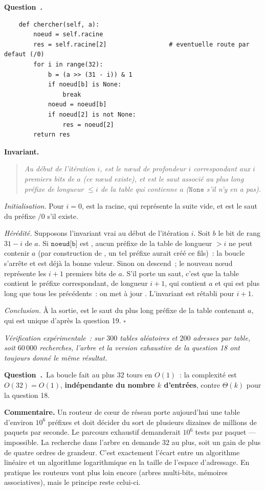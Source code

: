 \documentclass[11pt,a4paper]{article}
\renewcommand{\Q}{\medskip\par\stepcounter{qcnt}\noindent\textbf{\color{cnc}Question~\theqcnt.}~}
\begin{document}
\Q
\begin{lstlisting}
    def chercher(self, a):
        noeud = self.racine
        res = self.racine[2]                 # eventuelle route par defaut (/0)
        for i in range(32):
            b = (a >> (31 - i)) & 1
            if noeud[b] is None:
                break
            noeud = noeud[b]
            if noeud[2] is not None:
                res = noeud[2]
        return res
\end{lstlisting}
\textbf{Invariant.}
\begin{quote}\itshape
Au début de l'itération $i$,  est le n\oe ud de profondeur $i$ correspondant aux
$i$ premiers bits de $a$ (ce n\oe ud existe), et  est le saut associé au plus long
préfixe de longueur $\le i$ de la table qui contienne $a$ ($\texttt{None}$ s'il n'y en a pas).
\end{quote}
\emph{Initialisation.} Pour $i=0$,  est la racine, qui représente la suite vide,
et  est le saut du préfixe $/0$ s'il existe.

\emph{Hérédité.} Supposons l'invariant vrai au début de l'itération $i$. Soit $b$ le bit de
rang $31-i$ de $a$. Si $\texttt{noeud[b]}$ est , aucun préfixe de la table de
longueur $>i$ ne peut contenir $a$ (par construction de , un tel préfixe aurait
créé ce fils)~: la boucle s'arrête et  est déjà la bonne valeur. Sinon on descend~;
le nouveau n\oe ud représente les $i+1$ premiers bits de $a$. S'il porte un saut, c'est que
la table contient le préfixe correspondant, de longueur $i+1$, qui contient $a$ et qui est
plus long que tous les précédents~: on met à jour . L'invariant est rétabli pour
$i+1$.

\emph{Conclusion.} À la sortie,  est le saut du plus long préfixe de la table
contenant $a$, qui est unique d'après la question 19. \hfill$\square$

\emph{Vérification expérimentale~: sur $300$ tables aléatoires et $200$ adresses par table,
soit $60\,000$ recherches, l'arbre et la version exhaustive de la question 18 ont toujours
donné le même résultat.}

\Q La boucle fait au plus $32$ tours en $O(1)$~: la complexité est $\boxed{O(32)=O(1)}$,
\textbf{indépendante du nombre $k$ d'entrées}, contre $\Theta(k)$ pour la question 18.

\textbf{Commentaire.} Un routeur de c\oe ur de réseau porte aujourd'hui une table d'environ
$10^{6}$ préfixes et doit décider du sort de plusieurs dizaines de millions de paquets par
seconde. Le parcours exhaustif demanderait $10^{6}$ tests par paquet — impossible. La
recherche dans l'arbre en demande $32$ au plus, soit un gain de plus de quatre ordres de
grandeur. C'est exactement l'écart entre un algorithme linéaire et un algorithme
logarithmique en la taille de l'espace d'adressage. En pratique les routeurs vont plus loin
encore (arbres multi-bits, mémoires associatives), mais le principe reste celui-ci.
\end{document}
